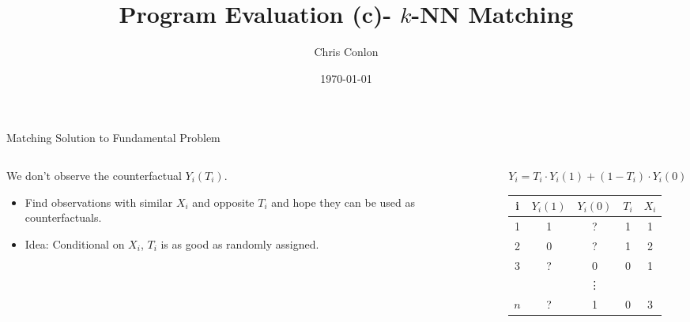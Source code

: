 \documentclass[xcolor=pdftex,dvipsnames,table,mathserif,aspectratio=169]{beamer}
\begin{document}
\title{Program Evaluation (c)- $k$-NN Matching}
\author{Chris Conlon}
\date{\today}

\frame{\titlepage}

\begin{frame}{Matching Solution to Fundamental Problem}
\begin{columns}[T] 
\begin{column}{.65\textwidth}
We don't observe the \alert{counterfactual} $Y_i(T_i)$.
\begin{itemize}
\item Find observations with similar $X_i$ and opposite $T_i$ and hope they can be used as counterfactuals.
\item Idea: Conditional on $X_i$, $T_i$ is as good as randomly assigned.
\end{itemize}
\end{column}%
\hfill%
\begin{column}{.38\textwidth}

  \vspace{20pt}
  
  $Y_{i} = T_{i}\cdot Y_{i}(1) + (1-T_{i}) \cdot Y_{i}(0)$\\
  \vspace{20pt}
  \begin{tabular}{ccccc}
    \toprule
    i & $Y_{i}(1)$ &  $Y_{i}(0)$ & $T_{i}$ & $X_{i}$ \\
    \midrule
    1 &     1      &     \alert{?}      &   1   & 1 \\
    2 &     0      &     \alert{?}      &   1   & 2 \\
    3 &     \alert{?}      &     0      &   0   & 1 \\
     & &  \vdots & & \\
    $n$ &     \alert{?}      &     1      &   0   & 3 \\    
  \end{tabular}
\end{column}%
\end{columns}
\end{frame}
\end{document}
